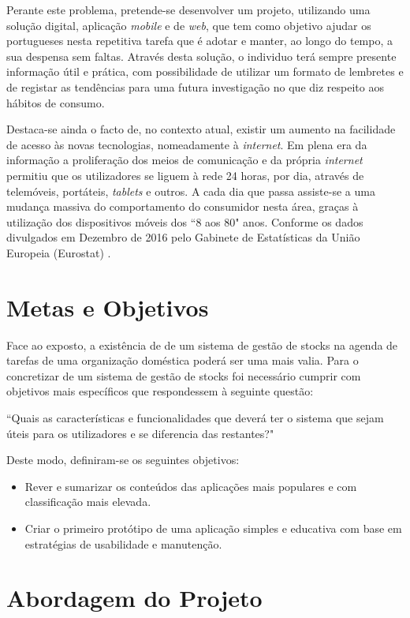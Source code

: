 Perante este problema, pretende-se desenvolver um projeto, utilizando uma solução digital, aplicação \textit{mobile} e de \textit{web}, que tem como objetivo ajudar os portugueses nesta repetitiva tarefa que é adotar e manter, ao longo do tempo, a sua despensa sem faltas.
Através desta solução, o individuo terá sempre presente informação útil e prática, com possibilidade de utilizar um formato de lembretes e de registar as tendências para uma futura investigação no que diz respeito aos hábitos de consumo.

Destaca-se ainda o facto de, no contexto atual, existir um aumento na facilidade de acesso às novas tecnologias, nomeadamente à \textit{internet}. Em plena era da informação a proliferação dos meios de comunicação e da própria \textit{internet} permitiu que os utilizadores se liguem à rede 24 horas, por dia, através de telemóveis, portáteis, \textit{tablets} e outros. A cada dia que passa assiste-se a uma mudança massiva do comportamento do consumidor nesta área, graças à utilização dos dispositivos móveis dos ``8 aos 80" anos. Conforme os dados divulgados em Dezembro de 2016 pelo Gabinete de Estatísticas da União Europeia (Eurostat) \cite{eurostat:internetAccess2016}.

%
%
\section{Metas e Objetivos} \label{sec12}
Face ao exposto, a existência de de um sistema de gestão de stocks na agenda de tarefas de uma organização doméstica poderá ser uma mais valia. Para o concretizar de um sistema de gestão de stocks foi necessário cumprir com objetivos mais específicos que respondessem à seguinte questão: 

``Quais as características e funcionalidades que deverá ter o sistema que sejam úteis para os utilizadores e se diferencia das restantes?"

Deste modo, definiram-se os seguintes objetivos:
\begin{itemize} \itemsep 0pt
	\item Rever e sumarizar os conteúdos das aplicações mais populares e com classificação mais elevada.
	\item Criar o primeiro protótipo de uma aplicação simples e educativa com base em estratégias de usabilidade e manutenção.
\end{itemize}

%
%
\section{Abordagem do Projeto} \label{sec13}

